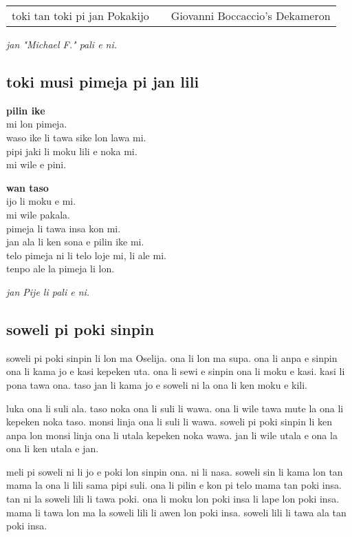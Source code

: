 \begin{supertabular}{p{5,5cm}|ll}
    toki tan toki pi jan Pokakijo &  & Giovanni Boccaccio's Dekameron \\
\end{supertabular}

\textit{jan "Michael F." pali e ni. \cite{www:failbluedot:01}}

\subsection{toki musi pimeja pi jan lili}
\textbf{pilin ike} \\
mi lon pimeja.  \\
waso ike li tawa sike lon lawa mi.  \\
pipi jaki li moku lili e noka mi.  \\
mi wile e pini.

\textbf{wan taso} \\
ijo li moku e mi.  \\
mi wile pakala.  \\
pimeja li tawa insa kon mi.  \\
jan ala li ken sona e pilin ike mi.  \\
telo pimeja ni li telo loje mi, li ale mi.  \\
tenpo ale la pimeja li lon.

\textit{jan Pije li pali e ni. \cite{www:Pije:01}}

\subsection{soweli pi poki sinpin}
soweli pi poki sinpin li lon ma Oselija.
ona li lon ma supa.
ona li anpa e sinpin ona li kama jo e kasi kepeken uta.
ona li sewi e sinpin ona li moku e kasi.
kasi li pona tawa ona.
taso jan li kama jo e soweli ni la ona li ken moku e kili.

luka ona li suli ala.
taso noka ona li suli li wawa.
ona li wile tawa mute la ona li kepeken noka taso.
monsi linja ona li suli li wawa.
soweli pi poki sinpin li ken anpa lon monsi linja ona li utala kepeken noka wawa.
jan li wile utala e ona la ona li ken utala e jan.

meli pi soweli ni li jo e poki lon sinpin ona.
ni li nasa.
soweli sin li kama lon tan mama la ona li lili sama pipi suli.
ona li pilin e kon pi telo mama tan poki insa.
tan ni la soweli lili li tawa poki.
ona li moku lon poki insa li lape lon poki insa.
mama li tawa lon ma la soweli lili li awen lon poki insa.
soweli lili li tawa ala tan poki insa.

